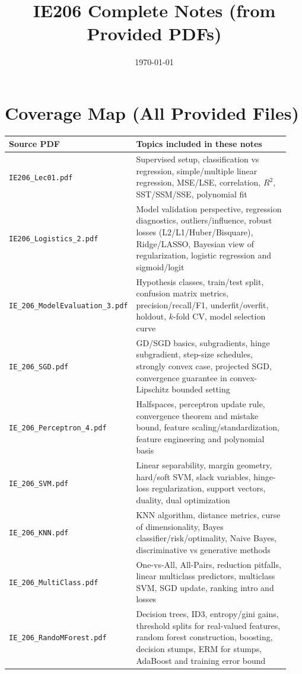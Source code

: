 \documentclass[11pt]{article}
\title{IE206 Complete Notes (from Provided PDFs)}
\author{}
\date{\today}
\newcommand{\1}{\mathbf{1}}
\begin{document}
\maketitle
\tableofcontents
\newpage

\section{Coverage Map (All Provided Files)}
\begin{center}
\begin{tabular}{>{\raggedright\arraybackslash}p{0.37\linewidth} >{\raggedright\arraybackslash}p{0.57\linewidth}}
\toprule
Source PDF & Topics included in these notes \\
\midrule
\texttt{IE206\_Lec01.pdf} & Supervised setup, classification vs regression, simple/multiple linear regression, MSE/LSE, correlation, $R^2$, SST/SSM/SSE, polynomial fit \\
\texttt{IE206\_Logistics\_2.pdf} & Model validation perspective, regression diagnostics, outliers/influence, robust losses (L2/L1/Huber/Bisquare), Ridge/LASSO, Bayesian view of regularization, logistic regression and sigmoid/logit \\
\texttt{IE\_206\_ModelEvaluation\_3.pdf} & Hypothesis classes, train/test split, confusion matrix metrics, precision/recall/F1, underfit/overfit, holdout, $k$-fold CV, model selection curve \\
\texttt{IE\_206\_SGD.pdf} & GD/SGD basics, subgradients, hinge subgradient, step-size schedules, strongly convex case, projected SGD, convergence guarantee in convex-Lipschitz bounded setting \\
\texttt{IE\_206\_Perceptron\_4.pdf} & Halfspaces, perceptron update rule, convergence theorem and mistake bound, feature scaling/standardization, feature engineering and polynomial basis \\
\texttt{IE\_206\_SVM.pdf} & Linear separability, margin geometry, hard/soft SVM, slack variables, hinge-loss regularization, support vectors, duality, dual optimization \\
\texttt{IE\_206\_KNN.pdf} & KNN algorithm, distance metrics, curse of dimensionality, Bayes classifier/risk/optimality, Naive Bayes, discriminative vs generative methods \\
\texttt{IE\_206\_MultiClass.pdf} & One-vs-All, All-Pairs, reduction pitfalls, linear multiclass predictors, multiclass SVM, SGD update, ranking intro and losses \\
\texttt{IE\_206\_RandoMForest.pdf} & Decision trees, ID3, entropy/gini gains, threshold splits for real-valued features, random forest construction, boosting, decision stumps, ERM for stumps, AdaBoost and training error bound \\

\end{tabular}
\end{center}
\end{document}
